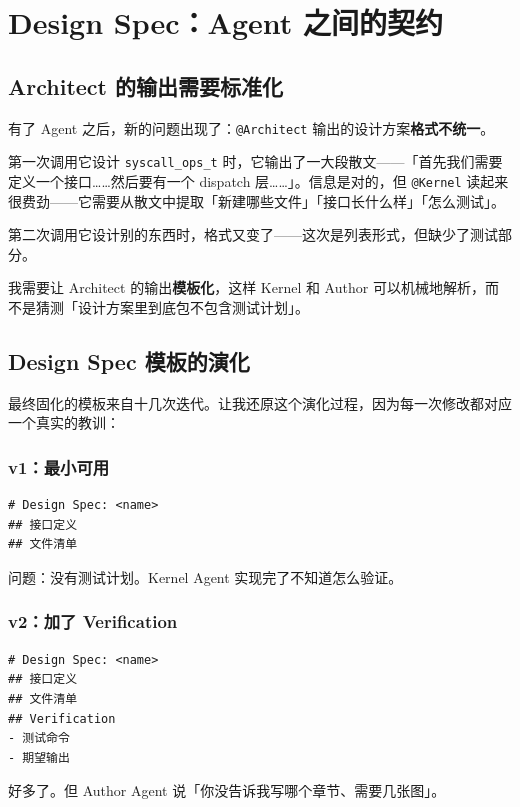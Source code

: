 \chapter{Design Spec：Agent 之间的契约}

\section{Architect 的输出需要标准化}

有了 Agent 之后，新的问题出现了：\texttt{@Architect} 输出的设计方案\textbf{格式不统一}。

第一次调用它设计 \texttt{syscall\_ops\_t} 时，它输出了一大段散文——「首先我们需要定义一个接口……然后要有一个 dispatch 层……」。信息是对的，但 \texttt{@Kernel} 读起来很费劲——它需要从散文中提取「新建哪些文件」「接口长什么样」「怎么测试」。

第二次调用它设计别的东西时，格式又变了——这次是列表形式，但缺少了测试部分。

我需要让 Architect 的输出\textbf{模板化}，这样 Kernel 和 Author 可以机械地解析，而不是猜测「设计方案里到底包不包含测试计划」。

\section{Design Spec 模板的演化}

最终固化的模板来自十几次迭代。让我还原这个演化过程，因为每一次修改都对应一个真实的教训：

\subsection{v1：最小可用}

\begin{lstlisting}[style=yamlstyle]
# Design Spec: <name>
## 接口定义
## 文件清单
\end{lstlisting}

问题：没有测试计划。Kernel Agent 实现完了不知道怎么验证。

\subsection{v2：加了 Verification}

\begin{lstlisting}[style=yamlstyle]
# Design Spec: <name>
## 接口定义
## 文件清单
## Verification
- 测试命令
- 期望输出
\end{lstlisting}

好多了。但 Author Agent 说「你没告诉我写哪个章节、需要几张图」。

